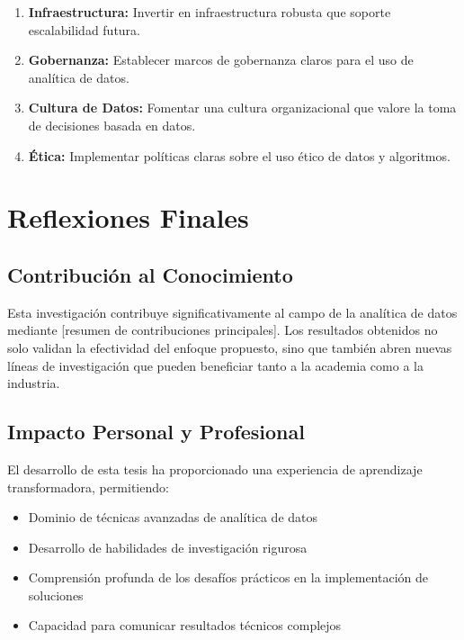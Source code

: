 \begin{enumerate}
    \item \textbf{Infraestructura:} Invertir en infraestructura robusta que soporte escalabilidad futura.
    
    \item \textbf{Gobernanza:} Establecer marcos de gobernanza claros para el uso de analítica de datos.
    
    \item \textbf{Cultura de Datos:} Fomentar una cultura organizacional que valore la toma de decisiones basada en datos.
    
    \item \textbf{Ética:} Implementar políticas claras sobre el uso ético de datos y algoritmos.
\end{enumerate}

\section{Reflexiones Finales}

\subsection{Contribución al Conocimiento}

Esta investigación contribuye significativamente al campo de la analítica de datos mediante [resumen de contribuciones principales]. Los resultados obtenidos no solo validan la efectividad del enfoque propuesto, sino que también abren nuevas líneas de investigación que pueden beneficiar tanto a la academia como a la industria.

\subsection{Impacto Personal y Profesional}

El desarrollo de esta tesis ha proporcionado una experiencia de aprendizaje transformadora, permitiendo:

\begin{itemize}
    \item Dominio de técnicas avanzadas de analítica de datos
    \item Desarrollo de habilidades de investigación rigurosa
    \item Comprensión profunda de los desafíos prácticos en la implementación de soluciones
    \item Capacidad para comunicar resultados técnicos complejos
\end{itemize}

